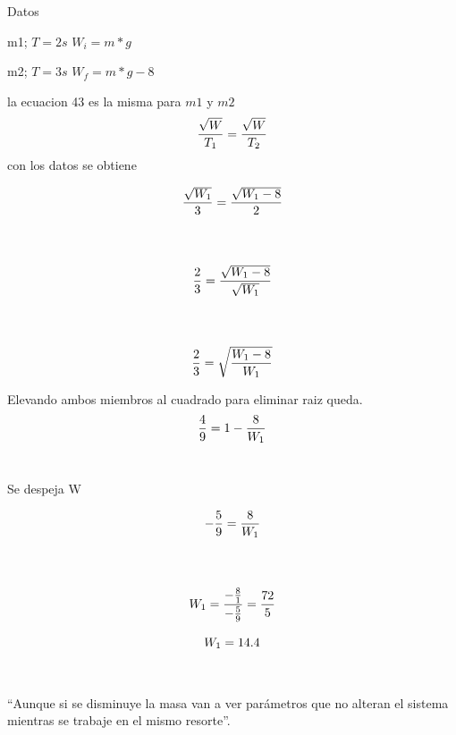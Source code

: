 \documentclass{article}
\begin{document}
\begin{center}
Datos
\end{center}

\begin{center}
m1; $T=2s$ \;\;\;\;\;$W_i=m*g$
\end{center}
\begin{center}
m2; $T=3s$ \;\;\;\;\;$W_f=m*g-8$
\end{center}
 
 la ecuacion 43  es la misma para $m1$ y $ m2$
 \begin{equation}
\LARGE\frac{\sqrt{W}}{T_1}=\frac{\sqrt{W}}{T_2}
\end{equation}
con los datos se obtiene 

 \begin{equation}
\LARGE\frac{\sqrt{W_1}}{3}=\frac{\sqrt{W_1-8}}{2}
\end{equation}
\\\\
 \begin{equation}
\LARGE\frac{2}{3}=\frac{\sqrt{W_1-8}}{\sqrt{W_1}}
\end{equation}
\\\\
\begin{equation}
\LARGE\frac{2}{3}=\sqrt{\frac{W_1-8}{W_1}}
\end{equation}

Elevando ambos miembros al cuadrado para eliminar raiz queda.
\begin{equation}
\LARGE\frac{4}{9}=1-\frac{8}{W_1}
\end{equation}
\\
\begin{center}
Se despeja W
\end{center}

\begin{equation}
\LARGE -\frac{5}{9}=\frac{8}{W_1}
\end{equation}
\\\\
\begin{equation}
\LARGE W_1=\frac{-\frac{8}{1}}{-\frac{5}{9}}=\frac{72}{5}
\end{equation}

\begin{equation}
\LARGE W_1=14.4
\end{equation}
\\\\
“Aunque si se disminuye la masa van a ver parámetros que no alteran el sistema mientras se trabaje en el mismo resorte”.  


 

\end{document}
